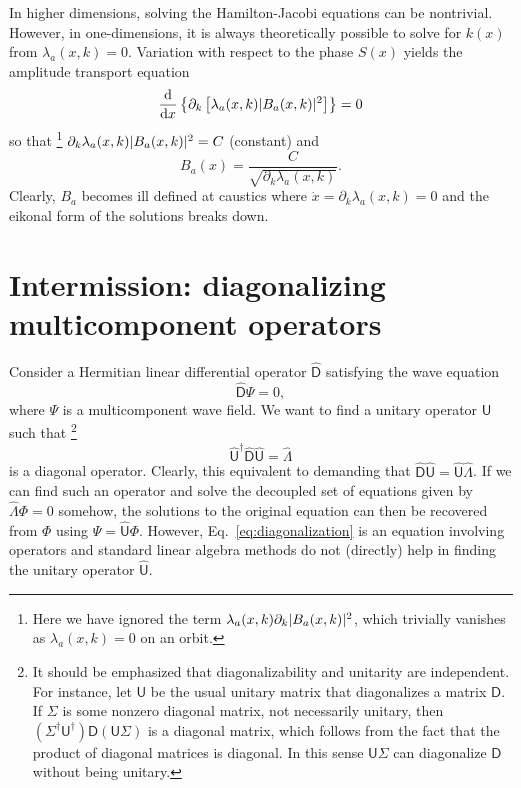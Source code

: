 In higher dimensions, solving the Hamilton-Jacobi equations can be nontrivial.
However, in one-dimensions, it is always theoretically possible to solve for $k(x)$ from $\lambda_{a}(x, k) = 0$.
Variation with respect to the phase $S(x)$ yields the amplitude transport equation
%
\begin{equation}
  \frac{\mathrm{d}}{\mathrm{d}{x}}\left\{\partial_{k}\left[\lambda_{a}(x, k)\lvert B_{a}(x, k)\rvert^{2}\right]\right\} = 0
\end{equation}
%
so that%
\footnote{Here we have ignored the term $\lambda_{a}(x, k)\partial_{k}\lvert B_{a}(x,k)\rvert^{2}$, which trivially vanishes as $\lambda_{a}(x, k) = 0$ on an orbit.}
$\partial_{k}\lambda_{a}(x, k)\lvert B_{a}(x, k)\rvert^{2} = C$ (constant) and
%
\begin{equation}
  B_{a}(x) = \frac{C}{\sqrt{\partial_{k}\lambda_{a}(x, k)}}.
\end{equation}
%
Clearly, $B_{a}$ becomes ill defined at caustics where $\dot{x} = \partial_{k}\lambda_{a}(x, k) = 0$ and the eikonal form of the solutions breaks down.

\section{Intermission: diagonalizing multicomponent operators}

Consider a Hermitian linear differential operator $\widehat{\mathsf{D}}$ satisfying the wave equation
%
\begin{equation}
  \widehat{\mathsf{D}}\Psi = 0,
\end{equation}
%
where $\Psi$ is a multicomponent wave field.
%
We want to find a unitary operator ${\mathsf{U}}$ such that%
\footnote{It should be emphasized that diagonalizability and unitarity are independent. For instance, let $\mathsf{U}$ be the usual unitary matrix that diagonalizes a matrix $\mathsf{D}$.
  If $\Sigma$ is some nonzero diagonal matrix, not necessarily unitary, then $(\Sigma^{\dagger}\mathsf{U}^{\dagger})\mathsf{D}(\mathsf{U}\Sigma)$ is a diagonal matrix, which follows from the fact that the product of diagonal matrices is diagonal.
  In this sense $\mathsf{U}\Sigma$ can diagonalize $\mathsf{D}$ without being unitary.}
%
\begin{equation}
  \widehat{\mathsf{U}}^{\dagger}\widehat{\mathsf{D}}\widehat{\mathsf{U}} = \hat{\Lambda}\label{eq:diagonalization}
\end{equation}
%
is a diagonal operator.
Clearly, this equivalent to demanding that $\widehat{\mathsf{D}}\widehat{\mathsf{U}} = \widehat{\mathsf{U}}\hat{\Lambda}$.
If we can find such an operator and solve the decoupled set of equations given by $\hat{\Lambda}\Phi = 0$ somehow,
the solutions to the original equation can then be recovered from $\Phi$ using $\Psi = \widehat{\mathsf{U}}\Phi$.
However, Eq.~\eqref{eq:diagonalization} is an equation involving operators and standard linear algebra methods do not (directly) help in finding the unitary operator $\widehat{\mathsf{U}}$.

